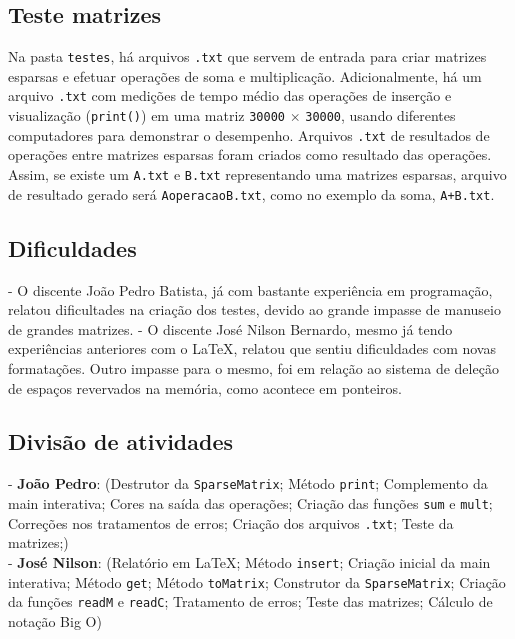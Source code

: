 \documentclass[12pt]{article}
\begin{document}
\subsection{Teste matrizes}

Na pasta \texttt{testes}, há arquivos \texttt{.txt} que servem de entrada para criar matrizes esparsas e efetuar operações de soma e multiplicação. Adicionalmente, há um arquivo \texttt{.txt} com medições de tempo médio das operações de inserção e visualização (\texttt{print()}) em uma matriz \texttt{30000} \(\times\) \texttt{30000}, usando diferentes computadores para demonstrar o desempenho. Arquivos \texttt{.txt} de resultados de operações entre matrizes esparsas foram criados como resultado das operações. Assim, se existe um \texttt{A.txt} e \texttt{B.txt} representando uma matrizes esparsas, arquivo de resultado gerado será \texttt{AoperacaoB.txt}, como no exemplo da soma, \texttt{A+B.txt}.

\subsection{Dificuldades}

- O discente João Pedro Batista, já com bastante experiência em programação, relatou dificultades na criação dos testes, devido ao grande impasse de manuseio de grandes matrizes.
- O discente José Nilson Bernardo, mesmo já tendo experiências anteriores com o \LaTeX, relatou que sentiu dificuldades com novas formatações. Outro impasse para o mesmo, foi em relação ao sistema de deleção de espaços revervados na memória, como acontece em ponteiros.


\subsection{Divisão de atividades}

- \textbf{João Pedro}: (Destrutor da \texttt{SparseMatrix}; Método \texttt{print}; Complemento da main interativa; Cores na saída das operações; Criação das funções \texttt{sum} e \texttt{mult}; Correções nos tratamentos de erros; Criação dos arquivos \texttt{.txt}; Teste da matrizes;)  
\\- \textbf{José Nilson}: (Relatório em \LaTeX; Método \texttt{insert}; Criação inicial da main interativa; Método \texttt{get}; Método \texttt{toMatrix}; Construtor da \texttt{SparseMatrix}; Criação da funções \texttt{readM} e \texttt{readC}; Tratamento de erros; Teste das matrizes; Cálculo de notação Big O)  
\end{document}
